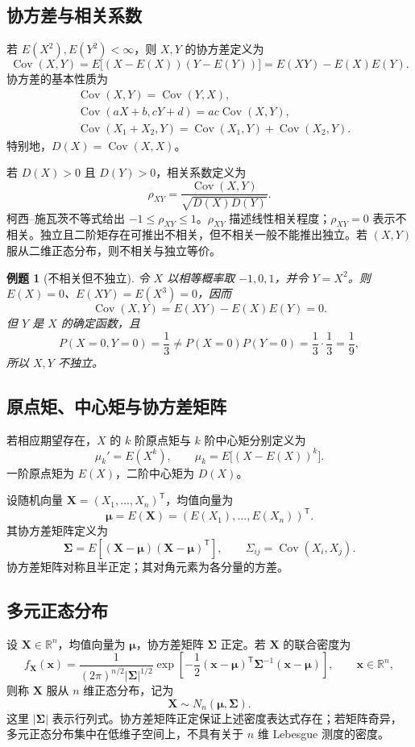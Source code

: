 \documentclass[11pt,a4paper,fontset=fandol]{ctexart}
\newtheorem{example}{例题}[section]
\theoremstyle{remark}
\begin{document}
\subsection{协方差与相关系数}
若 $E(X^2),E(Y^2)<\infty$，则 $X,Y$ 的协方差定义为
\[
    \operatorname{Cov}(X,Y)
    =E\bigl[(X-E(X))(Y-E(Y))\bigr]
    =E(XY)-E(X)E(Y).
\]
协方差的基本性质为
\[
\begin{aligned}
    &\operatorname{Cov}(X,Y)=\operatorname{Cov}(Y,X),\\
    &\operatorname{Cov}(aX+b,cY+d)=ac\operatorname{Cov}(X,Y),\\
    &\operatorname{Cov}(X_1+X_2,Y)
      =\operatorname{Cov}(X_1,Y)+\operatorname{Cov}(X_2,Y).
\end{aligned}
\]
特别地，$D(X)=\operatorname{Cov}(X,X)$。

若 $D(X)>0$ 且 $D(Y)>0$，相关系数定义为
\[
    \rho_{XY}
    =\frac{\operatorname{Cov}(X,Y)}
    {\sqrt{D(X)D(Y)}}.
\]
柯西--施瓦茨不等式给出 $-1\leq\rho_{XY}\leq1$。$\rho_{XY}$ 描述线性相关程度；$\rho_{XY}=0$ 表示不相关。独立且二阶矩存在可推出不相关，但不相关一般不能推出独立。若 $(X,Y)$ 服从二维正态分布，则不相关与独立等价。

\begin{example}[不相关但不独立]
令 $X$ 以相等概率取 $-1,0,1$，并令 $Y=X^2$。则 $E(X)=0$、$E(XY)=E(X^3)=0$，因而
\[
    \operatorname{Cov}(X,Y)=E(XY)-E(X)E(Y)=0.
\]
但 $Y$ 是 $X$ 的确定函数，且
\[
    P(X=0,Y=0)=\frac13
    \ne P(X=0)P(Y=0)=\frac13\cdot\frac13=\frac19,
\]
所以 $X,Y$ 不独立。
\end{example}

\subsection{原点矩、中心矩与协方差矩阵}
若相应期望存在，$X$ 的 $k$ 阶原点矩与 $k$ 阶中心矩分别定义为
\[
    \mu_k'=E(X^k),\qquad
    \mu_k=E\bigl[(X-E(X))^k\bigr].
\]
一阶原点矩为 $E(X)$，二阶中心矩为 $D(X)$。

设随机向量 $\bm{X}=(X_1,\ldots,X_n)^{\mathsf T}$，均值向量为
\[
    \bm{\mu}=E(\bm{X})
    =(E(X_1),\ldots,E(X_n))^{\mathsf T}.
\]
其协方差矩阵定义为
\[
    \bm{\Sigma}
    =E\left[(\bm{X}-\bm{\mu})(\bm{X}-\bm{\mu})^{\mathsf T}\right],
    \qquad
    \Sigma_{ij}=\operatorname{Cov}(X_i,X_j).
\]
协方差矩阵对称且半正定；其对角元素为各分量的方差。

\subsection{多元正态分布}
设 $\bm{X}\in\mathbb{R}^n$，均值向量为 $\bm{\mu}$，协方差矩阵 $\bm{\Sigma}$ 正定。若 $\bm{X}$ 的联合密度为
\[
    f_{\bm{X}}(\bm{x})
    =\frac{1}{(2\pi)^{n/2}|\bm{\Sigma}|^{1/2}}
      \exp\left[
        -\frac12(\bm{x}-\bm{\mu})^{\mathsf T}
        \bm{\Sigma}^{-1}(\bm{x}-\bm{\mu})
      \right],
    \qquad \bm{x}\in\mathbb{R}^n,
\]
则称 $\bm{X}$ 服从 $n$ 维正态分布，记为
\[
    \bm{X}\sim N_n(\bm{\mu},\bm{\Sigma}).
\]
这里 $|\bm{\Sigma}|$ 表示行列式。协方差矩阵正定保证上述密度表达式存在；若矩阵奇异，多元正态分布集中在低维子空间上，不具有关于 $n$ 维 Lebesgue 测度的密度。
\end{document}
